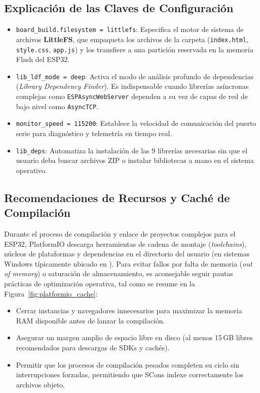 \documentclass[12pt,a4paper]{article}
\begin{document}
\subsection{Explicación de las Claves de Configuración}
\begin{itemize}
    \item \texttt{board\_build.filesystem = littlefs}: Especifica el motor de sistema de archivos \textbf{LittleFS}, que empaqueta los archivos de la carpeta  (\texttt{index.html}, \texttt{style.css}, \texttt{app.js}) y los transfiere a una partición reservada en la memoria Flash del ESP32.
    \item \texttt{lib\_ldf\_mode = deep}: Activa el modo de análisis profundo de dependencias (\textit{Library Dependency Finder}). Es indispensable cuando librerías asíncronas complejas como \texttt{ESPAsyncWebServer} dependen a su vez de capas de red de bajo nivel como \texttt{AsyncTCP}.
    \item \texttt{monitor\_speed = 115200}: Establece la velocidad de comunicación del puerto serie para diagnóstico y telemetría en tiempo real.
    \item \texttt{lib\_deps}: Automatiza la instalación de las 9 librerías necesarias sin que el usuario deba buscar archivos ZIP o instalar bibliotecas a mano en el sistema operativo.
\end{itemize}

\subsection{Recomendaciones de Recursos y Caché de Compilación}
Durante el proceso de compilación y enlace de proyectos complejos para el ESP32, PlatformIO descarga herramientas de cadena de montaje (\textit{toolchains}), núcleos de plataformas y dependencias en el directorio del usuario (en sistemas Windows típicamente ubicado en ). Para evitar fallos por falta de memoria (\textit{out of memory}) o saturación de almacenamiento, es aconsejable seguir pautas prácticas de optimización operativa, tal como se resume en la Figura~\ref{fig:platformio_cache}:
\begin{itemize}
    \item Cerrar instancias y navegadores innecesarios para maximizar la memoria RAM disponible antes de lanzar la compilación.
    \item Asegurar un margen amplio de espacio libre en disco (al menos 15\,GB libres recomendados para descargas de SDKs y cachés).
    \item Permitir que los procesos de compilación pesados completen su ciclo sin interrupciones forzadas, permitiendo que SCons indexe correctamente los archivos objeto.
\end{itemize}
\end{document}
